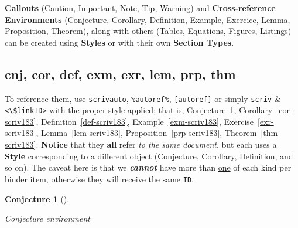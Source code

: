 \documentclass[
  12pt,
  a4paper,
  oneside,
  titlepage,
  toclink=all,
  toc=bibliography]{scrbook}
\theoremstyle{definition}
\theoremstyle{definition}
\theoremstyle{plain}
\theoremstyle{definition}
\theoremstyle{plain}
\theoremstyle{plain}
\newtheorem{conjecture}{Conjecture}[section]
\theoremstyle{plain}
\theoremstyle{plain}
\theoremstyle{remark}
\begin{document}
\begin{tcolorbox}[enhanced jigsaw, colbacktitle=quarto-callout-tip-color!10!white, arc=.35mm, titlerule=0mm, colframe=quarto-callout-tip-color-frame, coltitle=black, leftrule=.75mm, bottomrule=.15mm, opacityback=0, toptitle=1mm, breakable, bottomtitle=1mm, title=\textcolor{quarto-callout-tip-color}{\faLightbulb}\hspace{0.5em}{Tip}, toprule=.15mm, rightrule=.15mm, colback=white, opacitybacktitle=0.6, left=2mm]

\textbf{Callouts} (Caution, Important, Note, Tip, Warning) and
\textbf{Cross-reference Environments} (Conjecture, Corollary,
Definition, Example, Exercice, Lemma, Proposition, Theorem), along with
others (Tables, Equations, Figures, Listings) can be created using
\textbf{Styles} or with their own \textbf{Section Types}.

\end{tcolorbox}

\hypertarget{sec-scriv183}{%
\subsection{cnj, cor, def, exm, exr, lem, prp, thm}\label{sec-scriv183}}

\protect\hypertarget{scriv183}{}{}

To reference them, use \texttt{scrivautο}, \texttt{\%autοref\%},
\texttt{{[}autοref{]}} or simply \texttt{scriv} \&
\texttt{\textless{}\textbackslash{}\$linkID\textgreater{}} with the
proper style applied; that is,
\protect\hypertarget{cite_39}{}{\label{cite_39}Conjecture~\ref{cnj-scriv183}},
\protect\hypertarget{cite_40}{}{\label{cite_40}Corollary~\ref{cor-scriv183}},
\protect\hypertarget{cite_41}{}{\label{cite_41}Definition~\ref{def-scriv183}},
\protect\hypertarget{cite_42}{}{\label{cite_42}Example~\ref{exm-scriv183}},
\protect\hypertarget{cite_43}{}{\label{cite_43}Exercise~\ref{exr-scriv183}},
\protect\hypertarget{cite_44}{}{\label{cite_44}Lemma~\ref{lem-scriv183}},
\protect\hypertarget{cite_45}{}{\label{cite_45}Proposition~\ref{prp-scriv183}},
\protect\hypertarget{cite_46}{}{\label{cite_46}Theorem~\ref{thm-scriv183}}.
\textbf{Notice} that they \textbf{all} refer \emph{to the same
document}, but each uses a \textbf{Style} corresponding to a different
object (Conjecture, Corollary, Definition, and so on). The caveat here
is that we \textbf{\emph{cannot}} have more than \ul{one} of each kind
per binder item, otherwise they will receive the same \texttt{ID}.

\begin{conjecture}[]\protect\hypertarget{cnj-scriv183}{}\label{cnj-scriv183}

Conjecture environment

\end{conjecture}
\end{document}
